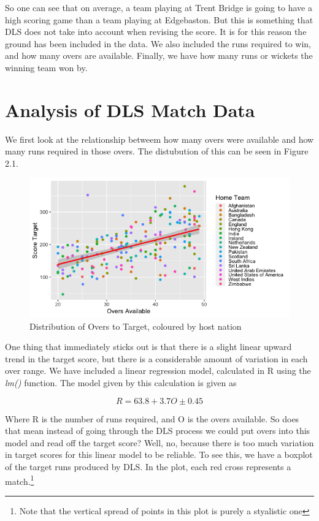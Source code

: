 So one can see that on average, a team playing at Trent Bridge is going to have a high scoring game than a team playing at Edgebaston. But this is something that DLS does
not take into account when revising the score. It is for this reason the ground has been included in the data. We also included the runs required to win, and how many overs
are available. Finally, we have how many runs or wickets the winning team won by. 

\section{Analysis of DLS Match Data}

We first look at the relationship betweem how many overs were available and how many runs required in those overs. The distubution of this can be seen in Figure 2.1.


\begin{figure}[t]
    \centering
    \includegraphics[scale=0.7]{figures/dlsOversScore.png}
    \caption{Distribution of Overs to Target, coloured by host nation }
    \label{figure 2.1}
\end{figure}

One thing that immediately sticks out is that there is a slight linear upward trend in the target score, but there is a considerable amount of variation in each over range. 
We have included a linear regression model, calculated in R using the \textit{lm()} function. The model given by this calculation is given as 

$$
    R = 63.8 + 3.7O \pm 0.45
$$

Where R is the number of runs required, and O is the overs available. So does that mean instead of going through the DLS process we could put overs into this model and read off the target score?
Well, no, because there is too much variation in target scores for this linear model to be reliable. To see this, we have a boxplot of the target runs produced by DLS. In the plot, each red cross 
represents a match.\footnote{Note that the vertical spread of points in this plot is purely a styalistic one}

